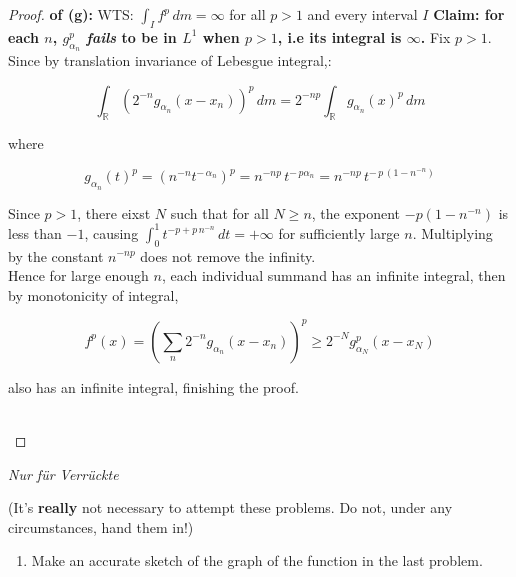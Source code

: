 \documentclass{qlnotes-export}
\begin{document}
\begin{proof}

\textbf{of (g):} WTS: \(\int_{I}f^{p}\, dm = \infty\) for all \(p > 1\) and every interval \(I\) \textbf{Claim: for each \(n\), \(g_{\alpha_{n}}^{p}\) \emph{fails} to be in \(L^{1}\) when \(p > 1\), i.e its integral is \(\infty\).} Fix \(p > 1\).\\
Since by translation invariance of Lebesgue integral,:

\[\int_{\mathbb{R}}(2^{- n}g_{\alpha_{n}}(x - x_{n}))^{p}\, dm = 2^{- np}\int_{\mathbb{R}}g_{\alpha_{n}}(x)^{p}\, dm\]

where

\[g_{\alpha_{n}}(t)^{p} = (n^{- n}t^{- \,\alpha_{n}})^{p} = n^{- np}\, t^{- \, p\alpha_{n}} = n^{- np}\, t^{- \, p\,(1 - n^{- n})}\]

Since \(p > 1\), there eixst \(N\) such that for all \(N \geq n\), the exponent \(- p(1 - n^{- n})\) is less than \(- 1\), causing \(\int_{0}^{1}t^{- p + p\, n^{- n}}\, dt = + \infty\) for sufficiently large \(n\). Multiplying by the constant \(n^{- np}\) does not remove the infinity.\\
Hence for large enough \(n\), each individual summand has an infinite integral, then by monotonicity of integral,

\[f^{p}(x) = (\sum\limits_{n}2^{- n}g_{\alpha_{n}}(x - x_{n}))^{p} \geq 2^{- N}g_{\alpha_{N}}^{p}(x - x_{N})\]

also has an infinite integral, finishing the proof.\\
\strut \\

\end{proof}

\emph{Nur für Verrückte}

(It's \textbf{really} not necessary to attempt these problems. Do not, under any circumstances, hand them in!)

\begin{enumerate}
\tightlist
\item
  Make an accurate sketch of the graph of the function in the last problem.
\end{enumerate}
\end{document}
